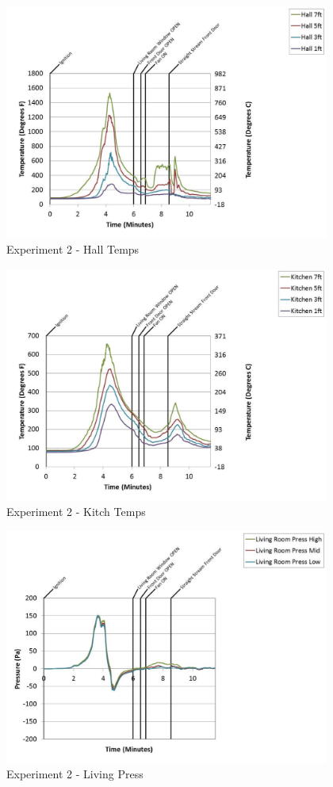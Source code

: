 \documentclass{article}
\begin{document}
\begin{appendices}
	\begin{figure}[h!]
		\centering
		\includegraphics[height=3.05in]{0_Images/Results_Charts/Exp_2_Charts/HallTemps.pdf}
		\caption{Experiment 2 - Hall Temps}
	\end{figure}
 
	\clearpage

	\begin{figure}[h!]
		\centering
		\includegraphics[height=3.05in]{0_Images/Results_Charts/Exp_2_Charts/KitchTemps.pdf}
		\caption{Experiment 2 - Kitch Temps}
	\end{figure}
 

	\begin{figure}[h!]
		\centering
		\includegraphics[height=3.05in]{0_Images/Results_Charts/Exp_2_Charts/LivingPress.pdf}
		\caption{Experiment 2 - Living Press}
	\end{figure}
 

\end{appendices}
\end{document}
